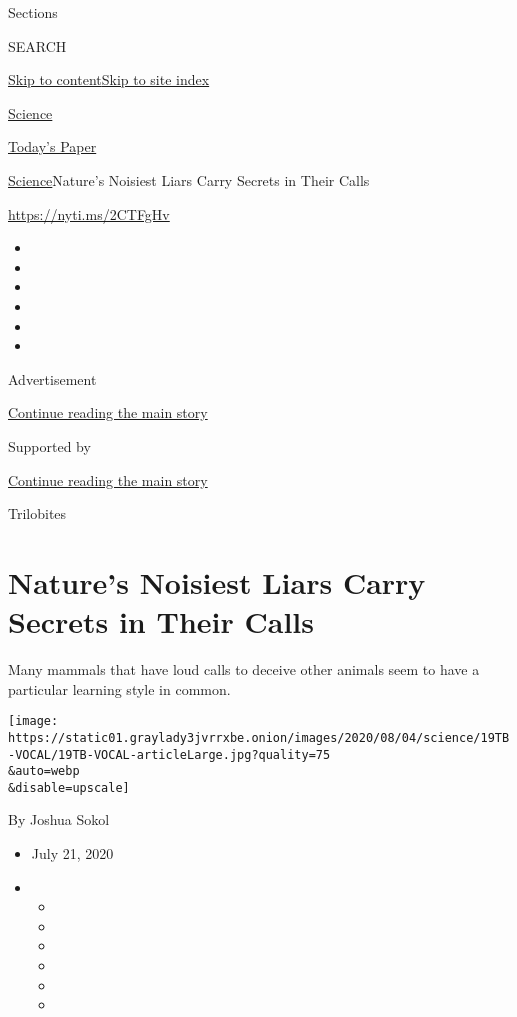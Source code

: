 Sections

SEARCH

\protect\hyperlink{site-content}{Skip to
content}\protect\hyperlink{site-index}{Skip to site index}

\href{https://www.nytimes3xbfgragh.onion/section/science}{Science}

\href{https://myaccount.nytimes3xbfgragh.onion/auth/login?response_type=cookie\&client_id=vi}{}

\href{https://www.nytimes3xbfgragh.onion/section/todayspaper}{Today's
Paper}

\href{/section/science}{Science}\textbar{}Nature's Noisiest Liars Carry
Secrets in Their Calls

\url{https://nyti.ms/2CTFgHv}

\begin{itemize}
\item
\item
\item
\item
\item
\item
\end{itemize}

Advertisement

\protect\hyperlink{after-top}{Continue reading the main story}

Supported by

\protect\hyperlink{after-sponsor}{Continue reading the main story}

Trilobites

\hypertarget{natures-noisiest-liars-carry-secrets-in-their-calls}{%
\section{Nature's Noisiest Liars Carry Secrets in Their
Calls}\label{natures-noisiest-liars-carry-secrets-in-their-calls}}

Many mammals that have loud calls to deceive other animals seem to have
a particular learning style in common.

\texttt{[image: https://static01.graylady3jvrrxbe.onion/images/2020/08/04/science/19TB-VOCAL/19TB-VOCAL-articleLarge.jpg?quality=75\\\&auto=webp\\\&disable=upscale]}

By Joshua Sokol

\begin{itemize}
\item
  July 21, 2020
\item
  \begin{itemize}
  \item
  \item
  \item
  \item
  \item
  \item
  \end{itemize}
\end{itemize}

